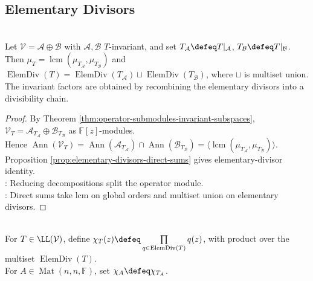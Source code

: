 \subsection{Elementary Divisors}

\begin{theorem} \label{thm:reducing-decompositions-combine-elementary-divisors} \\
Let $\mathcal{V}=\mathcal{A}\oplus\mathcal{B}$ with $\mathcal{A},\mathcal{B}$ $T$-invariant, and set $T_{\mathcal{A}}\defeq T|_{\mathcal{A}}$, $T_{\mathcal{B}}\defeq T|_{\mathcal{B}}$.\\
Then $\mu_T=\operatorname{lcm}(\mu_{T_{\mathcal{A}}},\mu_{T_{\mathcal{B}}})$ and $\operatorname{ElemDiv}(T)=\operatorname{ElemDiv}(T_{\mathcal{A}})\sqcup\operatorname{ElemDiv}(T_{\mathcal{B}})$, where $\sqcup$ is multiset union.\\
The invariant factors are obtained by recombining the elementary divisors into a divisibility chain.
\begin{proof}
By Theorem \ref{thm:operator-submodules-invariant-subspaces}, $\mathcal{V}_T=\mathcal{A}_{T_{\mathcal{A}}}\oplus\mathcal{B}_{T_{\mathcal{B}}}$ as $\mathbb{F}[z]$-modules.\\
Hence $\operatorname{Ann}(\mathcal{V}_T)=\operatorname{Ann}(\mathcal{A}_{T_{\mathcal{A}}})\cap\operatorname{Ann}(\mathcal{B}_{T_{\mathcal{B}}})=\langle\operatorname{lcm}(\mu_{T_{\mathcal{A}}},\mu_{T_{\mathcal{B}}})\rangle$.\\
Proposition \ref{prop:elementary-divisors-direct-sums} gives elementary-divisor identity.\\
: Reducing decompositions split the operator module.\\
: Direct sums take lcm on global orders and multiset union on elementary divisors.
\end{proof}
\end{theorem}

\begin{definition} \label{def:characteristic-polynomial-from-elementary-divisors} \\
For $T\in\LL(\mathcal{V})$, define $\chi_T(z)\defeq\prod\limits_{q\in\operatorname{ElemDiv}(T)}q(z)$, with product over the multiset $\operatorname{ElemDiv}(T)$.\\
For $A\in\operatorname{Mat}(n,n,\mathbb{F})$, set $\chi_A\defeq\chi_{T_A}$.
\end{definition}

